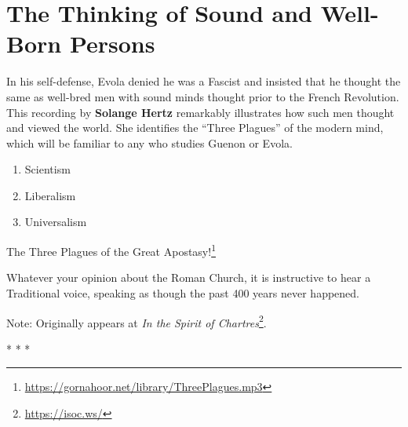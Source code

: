 \section{The Thinking of Sound and Well-Born Persons}

In his self-defense, Evola denied he was a Fascist and insisted that he thought the same as well-bred men with sound minds thought prior to the French Revolution. This recording by \textbf{Solange Hertz} remarkably illustrates how such men thought and viewed the world. She identifies the ``Three Plagues'' of the modern mind, which will be familiar to any who studies Guenon or Evola.

\begin{enumerate}
\item Scientism
\item Liberalism
\item Universalism
\end{enumerate}

The Three Plagues of the Great Apostasy!\footnote{\url{https://gornahoor.net/library/ThreePlagues.mp3}}

Whatever your opinion about the Roman Church, it is instructive to hear a Traditional voice, speaking as though the past 400 years never happened.

Note: Originally appears at \textit{In the Spirit of Chartres}\footnote{\url{https://isoc.ws/}}.



\begin{center}* * *\end{center}

